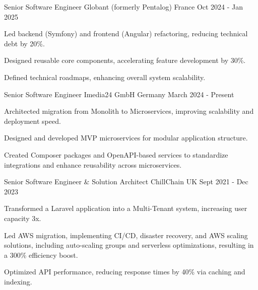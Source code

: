 

\begin{cventries}

\cventry
{Senior Software Engineer} %
{Globant (formerly Pentalog)} %
{France} %
{Oct 2024 - Jan 2025} %
{
  \begin{cvitems} %
    \item {Led backend (Symfony) and frontend (Angular) refactoring, reducing technical debt by 20\%.}
    \item {Designed reusable core components, accelerating feature development by 30\%.}
    \item {Defined technical roadmaps, enhancing overall system scalability.}
  \end{cvitems}
}

\cventry
{Senior Software Engineer} %
{Imedia24 GmbH} %
{Germany} %
{March 2024 - Present} %
{
  \begin{cvitems} %
    \item {Architected migration from Monolith to Microservices, improving scalability and deployment speed.}
    \item {Designed and developed MVP microservices for modular application structure.}
    \item {Created Composer packages and OpenAPI-based services to standardize integrations and enhance reusability across microservices.}
  \end{cvitems}
}

\cventry
{Senior Software Engineer \& Solution Architect} %
{ChillChain} %
{UK} %
{Sept 2021 - Dec 2023} %
{
  \begin{cvitems} %
    \item {Transformed a Laravel application into a Multi-Tenant system, increasing user capacity 3x.}
    \item {Led AWS migration, implementing CI/CD, disaster recovery, and AWS scaling solutions, including auto-scaling groups and serverless optimizations, resulting in a 300\% efficiency boost.}
    \item {Optimized API performance, reducing response times by 40\% via caching and indexing.}
  \end{cvitems}
}


\end{cventries}
